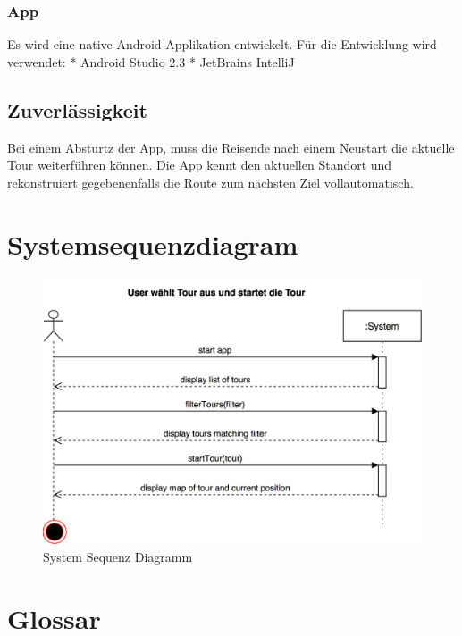 \documentclass[ngerman,]{article}
\begin{document}
\subsubsection{App}\label{app}

Es wird eine native Android Applikation entwickelt. Für die Entwicklung
wird verwendet: * Android Studio 2.3 * JetBrains IntelliJ

\subsection{Zuverlässigkeit}\label{zuverluxe4ssigkeit}

Bei einem Absturtz der App, muss die Reisende nach einem Neustart die
aktuelle Tour weiterführen können. Die App kennt den aktuellen Standort
und rekonstruiert gegebenenfalls die Route zum nächsten Ziel
vollautomatisch.

\section{Systemsequenzdiagram}\label{systemsequenzdiagram}

\begin{figure}
\centering
\includegraphics{docs/diagrams/UC1_SystemSequenzDiagram.png}
\caption{System Sequenz Diagramm}
\end{figure}

\section{Glossar}\label{glossar}
\end{document}

